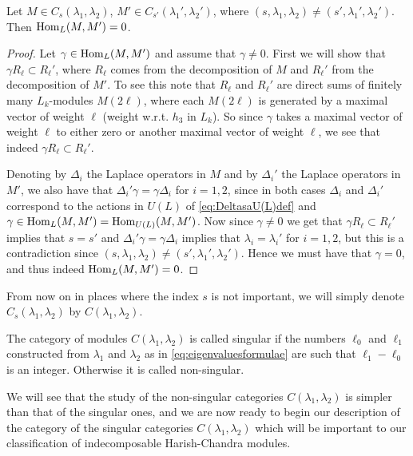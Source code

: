 \begin{proposition}\label{prop:modulehom}
  Let $M\in C_s(\lambda_1,\lambda_2)$, $M'\in C_{s'}(\lambda_1',\lambda_2')$, where $(s,\lambda_1,\lambda_2)\neq (s',\lambda_1',\lambda_2')$. Then $\operatorname{Hom}_L(M,M')=0$.
\end{proposition}
\begin{proof}
  Let $\gamma\in\operatorname{Hom}_L(M,M')$ and assume that $\gamma\neq 0$. First we will show that $\gamma R_\ell \subset R_\ell'$, where $R_\ell$ comes from the decomposition of $M$ and $R_\ell'$ from the decomposition of $M'$. To see this note that $R_\ell$ and $R_\ell'$ are direct sums of finitely many $L_k$-modules $M(2\ell)$, where each $M(2\ell)$ is generated by a maximal vector of weight $\ell$ (weight w.r.t. $h_3$ in $L_k$). So since $\gamma$ takes a maximal vector of weight $\ell$ to either zero or another maximal vector of weight $\ell$, we see that indeed $\gamma R_\ell \subset R_\ell'$.
  
  Denoting by $\Delta_i$ the Laplace operators in $M$ and by $\Delta_i'$ the Laplace operators in $M'$, we also have that $\Delta_i' \gamma = \gamma \Delta_i$ for $i=1,2$, since in both cases $\Delta_i$ and $\Delta_i'$ correspond to the actions in $U(L)$ of \cref{eq:DeltasaU(L)def} and $\gamma\in\operatorname{Hom}_L(M,M')=\operatorname{Hom}_{U(L)}(M,M')$. Now since $\gamma\neq 0$ we get that $\gamma R_\ell \subset R_\ell'$ implies that $s=s'$ and $\Delta_i'\gamma=\gamma\Delta_i$ implies that $\lambda_i=\lambda_i'$ for $i=1,2$, but this is a contradiction since $(s,\lambda_1,\lambda_2)\neq (s',\lambda_1',\lambda_2')$. Hence we must have that $\gamma=0$, and thus indeed $\operatorname{Hom}_L(M,M')=0$. 
\end{proof}

\begin{remark}
  From now on in places where the index $s$ is not important, we will simply denote $C_s(\lambda_1,\lambda_2)$ by $C(\lambda_1,\lambda_2)$. 
\end{remark}

\begin{definition}
  The category of modules $C(\lambda_1,\lambda_2)$ is called singular if the numbers $\ell_0$ and $\ell_1$ constructed from $\lambda_1$ and $\lambda_2$ as in \cref{eq:eigenvaluesformulae} are such that $\ell_1-\ell_0$ is an integer. Otherwise it is called non-singular.
\end{definition}

We will see that the study of the non-singular categories $C(\lambda_1,\lambda_2)$ is simpler than that of the singular ones, and we are now ready to begin our description of the category of the singular categories $C(\lambda_1,\lambda_2)$ which will be important to our classification of indecomposable Harish-Chandra modules. 

